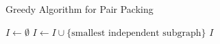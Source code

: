 \begin{frame}{Greedy Algorithm for Pair Packing}


\begin{algorithm}[H]
\begin{algorithmic}[1]

\STATE $I \gets \emptyset$
\STATE $I \gets I \cup \{\text{smallest independent subgraph}\}$
\ENDWHILE
\RETURN $I$


\end{algorithmic}
\caption{Greedy Algorithm}
\end{algorithm}


\end{frame}